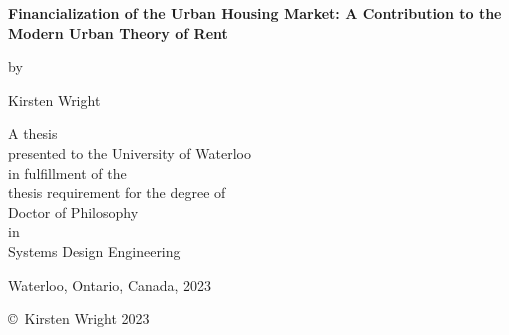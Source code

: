 \pagestyle{empty}

\begin{titlepage}
        \begin{center}
        \vspace*{1.0cm}

        \Huge
        {\bf Financialization of the Urban Housing Market: A Contribution to the Modern Urban Theory of Rent}

        \vspace*{1.0cm}

        \normalsize
        by \\

        \vspace*{1.0cm}

        \Large
        Kirsten Wright \\

        \vspace*{3.0cm}

        \normalsize
        A thesis \\
        presented to the University of Waterloo \\ 
        in fulfillment of the \\
        thesis requirement for the degree of \\
        Doctor of Philosophy \\
        in \\
        Systems Design Engineering \\

        \vspace*{2.0cm}

        Waterloo, Ontario, Canada, 2023 \\

        \vspace*{1.0cm}

        \copyright\ Kirsten Wright 2023 \\
        \end{center}
\end{titlepage}

\pagestyle{plain}
\setcounter{page}{2}

\cleardoublepage %
 
